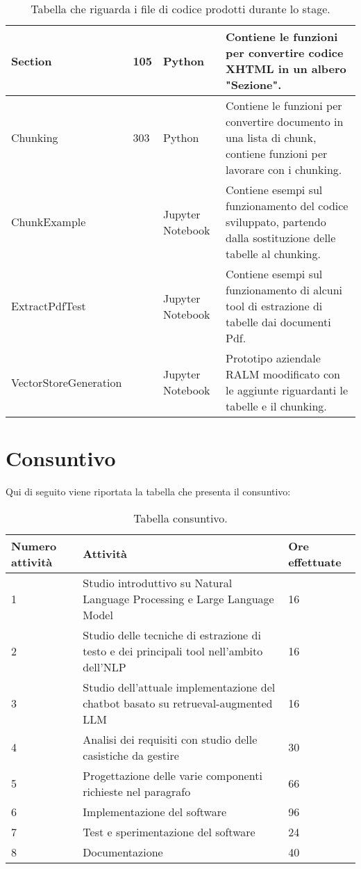 \begin{table}[H]
\begin{tabular}{|p{4cm} |p{1cm} | p{2cm} |p{6cm}|}
        \hline 
        Section & 105 & Python & Contiene le funzioni per convertire codice XHTML in un albero "Sezione". \\
        \hline
        Chunking & 303 & Python & Contiene le funzioni per convertire documento in una lista di chunk, contiene funzioni per lavorare con i chunking. \\
        \hline
        ChunkExample &  & Jupyter Notebook & Contiene esempi sul funzionamento del codice sviluppato, partendo dalla sostituzione delle tabelle al chunking. \\
        \hline 
        ExtractPdfTest & & Jupyter Notebook & Contiene esempi sul funzionamento di alcuni tool di estrazione di tabelle dai documenti Pdf. \\
        \hline
        VectorStoreGeneration & & Jupyter Notebook & Prototipo aziendale RALM moodificato con le aggiunte riguardanti le tabelle e il chunking. \\
        \hline 
    \end{tabular}
    \caption{Tabella che riguarda i file di codice prodotti durante lo stage.}
\end{table}

\section{Consuntivo}
Qui di seguito viene riportata la tabella che presenta il consuntivo: 
\begin{table}[H]
    \centering
    \begin{tabular}{p{2cm} p{8cm} p{2cm}}
        \hline
        Numero attività & Attività & Ore effettuate \\
        \hline
        1 & Studio introduttivo su Natural Language Processing e Large Language Model & 16 \\
        \hline
        2 & Studio delle tecniche di estrazione di testo e dei principali tool nell'ambito dell'NLP & 16 \\
        \hline
        3 & Studio dell'attuale implementazione del chatbot basato su retrueval-augmented LLM & 16 \\
        \hline
        4 & Analisi dei requisiti con studio delle casistiche da gestire & 30 \\
        \hline
        5 & Progettazione delle varie componenti richieste nel paragrafo  & 66 \\
        \hline
        6 & Implementazione del software & 96 \\
        \hline
        7 & Test e sperimentazione del software & 24 \\
        \hline
        8 & Documentazione & 40 \\
        \hline
    \end{tabular}
    \caption{Tabella consuntivo.}
\end{table}

